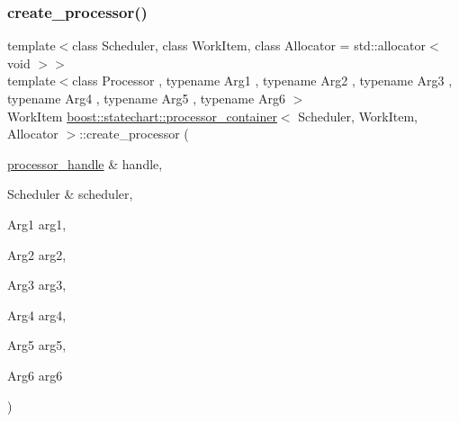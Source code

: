 \subsubsection{\texorpdfstring{create\+\_\+processor()}{create\_processor()}\hspace{0.1cm}{\footnotesize\ttfamily [7/7]}}
{\footnotesize\ttfamily template$<$class Scheduler, class Work\+Item, class Allocator = std\+::allocator$<$ void $>$$>$ \\
template$<$class Processor , typename Arg1 , typename Arg2 , typename Arg3 , typename Arg4 , typename Arg5 , typename Arg6 $>$ \\
Work\+Item \mbox{\hyperlink{classboost_1_1statechart_1_1processor__container}{boost\+::statechart\+::processor\+\_\+container}}$<$ Scheduler, Work\+Item, Allocator $>$\+::create\+\_\+processor (\begin{DoxyParamCaption}\item[{\mbox{\hyperlink{classboost_1_1statechart_1_1processor__container_a82ebbffaed81d7b99119ae0e892f6411}{processor\+\_\+handle}} \&}]{handle,  }\item[{Scheduler \&}]{scheduler,  }\item[{Arg1}]{arg1,  }\item[{Arg2}]{arg2,  }\item[{Arg3}]{arg3,  }\item[{Arg4}]{arg4,  }\item[{Arg5}]{arg5,  }\item[{Arg6}]{arg6 }\end{DoxyParamCaption})\hspace{0.3cm}{\ttfamily [inline]}}

\mbox{\label{classboost_1_1statechart_1_1processor__container_abd000284faf4ed22dcc8a31214576f3e}} 
